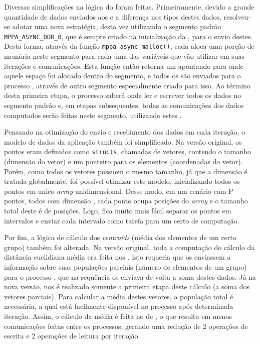 Diversas simplificações na lógica do  \KM foram feitas. Primeiramente, devido a grande quantidade de dados enviados aos \CCs e a diferença nos tipos destes dados, resolveu-se adotar uma nova estratégia, desta vez utilizando o segmento padrão \texttt{MPPA\_ASYNC\_DDR\_0}, que é sempre criado na inicialização da \ASYNC, para o envio destes. Desta forma, através da função \texttt{mppa\_async\_malloc()}, cada \slave aloca uma porção de memória neste segmento para cada uma das variáveis que vão utilizar em suas iterações e comunicações. Esta função então retorna um \offset apontando para onde aquele espaço foi alocado dentro do segmento, e todos os \offsets são enviados para o processo \master, através de outro segmento especialmente criado para isso. Ao término desta primeira etapa, o processo \master saberá onde ler e escrever todos os dados no segmento padrão e, em etapas subsequentes, todas as comunicações dos dados computados serão feitas neste segmento, utilizando estes \offsets.

Pensando na otimização do envio e recebimento dos dados em cada iteração, o modelo de dados da aplicação também foi simplificado. Na versão original, os pontos eram definidos como \texttt{structs}, chamadas de vetores, contendo o tamanho (dimensão do vetor) e um ponteiro para os elementos (coordenadas do vetor). Porém, como todos os vetores possuem o mesmo tamanho, já que a dimensão é tratada globalmente, foi possível otimizar este modelo, inicializando todos os pontos em unico \textit{array} unidimensional. Desse modo, em um cenário com P pontos, todos com dimensão , cada ponto ocupa  posições do \textit{array} e o tamanho total deste é de  posições. Logo, fica muito mais fácil separar os pontos em intervalos e enviar cada intervalo como tarefa para um certo \cluster de computação.

Por fim, a lógica de cálculo dos \textit{centroids} (média dos elementos de um certo grupo) também foi alterada. Na versão original, toda a computação do cálculo da distância euclidiana média era feita nos \CCs. Isto requeria que os \CCs enviassem a informação sobre suas populações parciais (número de elementos de um grupo) para o processo \master, que na sequência os enviava de volta a soma destes dados. Já na nova versão, nos \CCs é realizado somente a primeira etapa deste cálculo (a soma dos vetores parciais). Para calcular a média destes vetores, a população total é necessária, a qual está facilmente disponível no processo \master após determinada iteração. Assim, o cálculo da média é feita no \cluster de \IO, o que resulta em menos comunicações feitas entre os processos, gerando uma redução de 2 operações de escrita e 2 operações de leitura por iteração.

